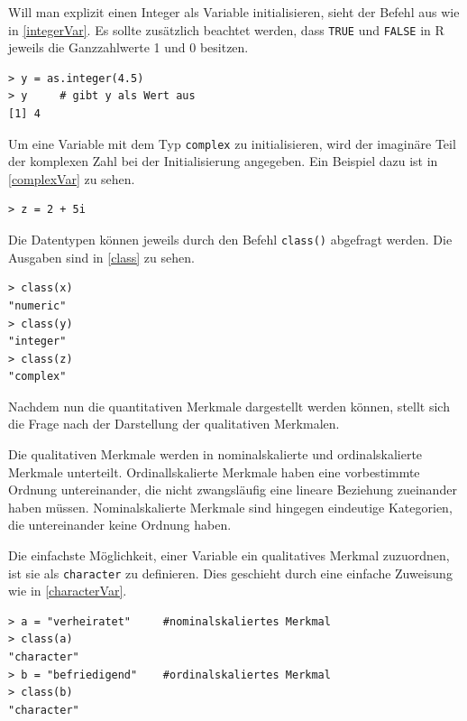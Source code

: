 \documentclass[a4paper, 12pt]{report} %
\begin{document}
Will man explizit einen Integer als Variable initialisieren, sieht der Befehl aus wie in \ref{integerVar}. Es sollte zusätzlich beachtet werden, dass \texttt{TRUE} und \texttt{FALSE} in R jeweils die Ganzzahlwerte 1 und 0 besitzen. 

\lstset{language=R}
\begin{lstlisting}[frame=single,caption={Deklarierung einer ganzzahligen Variable y}]
> y = as.integer(4.5)
> y 	# gibt y als Wert aus 
[1] 4
\end{lstlisting}
\label{integerVar}

Um eine Variable mit dem Typ \texttt{complex} zu initialisieren, wird der imaginäre Teil der komplexen Zahl bei der Initialisierung angegeben. Ein Beispiel dazu ist in \ref{complexVar} zu sehen.

\lstset{language=R}
\begin{lstlisting}[frame=single,caption={Deklarierung einer komplexen Variable z}]
> z = 2 + 5i
\end{lstlisting}
\label{complexVar}

Die Datentypen können jeweils durch den Befehl \texttt{class()} abgefragt werden. Die Ausgaben sind in \ref{class} zu sehen. 

\lstset{language=R}
\begin{lstlisting}[frame=single,caption={Abfrage des Datentypen}]
> class(x)
"numeric"
> class(y)
"integer"
> class(z)
"complex"
\end{lstlisting}
\label{class}

Nachdem nun die quantitativen Merkmale dargestellt werden können, stellt sich die Frage nach der Darstellung der qualitativen Merkmalen. 

Die qualitativen Merkmale werden in nominalskalierte und ordinalskalierte Merkmale unterteilt. Ordinallskalierte Merkmale haben eine vorbestimmte Ordnung untereinander, die nicht zwangsläufig eine lineare Beziehung zueinander haben müssen. Nominalskalierte Merkmale sind hingegen eindeutige Kategorien, die untereinander keine Ordnung haben. 

Die einfachste Möglichkeit, einer Variable ein qualitatives Merkmal zuzuordnen, ist sie als \texttt{character} zu definieren. Dies geschieht durch eine einfache Zuweisung wie in \ref{characterVar}.

\lstset{language=R}
\begin{lstlisting}[frame=single,caption={Deklarierung einer qualitativen Variable a}]
> a = "verheiratet"     #nominalskaliertes Merkmal
> class(a)
"character"
> b = "befriedigend"	#ordinalskaliertes Merkmal
> class(b)
"character"
\end{lstlisting}
\label{characterVar}
\end{document}
